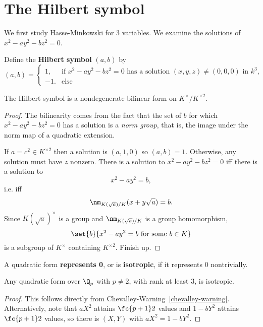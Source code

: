 \section{The Hilbert symbol}
We first study Hasse-Minkowski for 3 variables. We examine the solutions of $x^2-ay^2-bz^2=0$.
\begin{df}
Define the \textbf{Hilbert symbol} $(a,b)$ by
\[
(a,b)=\begin{cases}
1,&\text{if }x^2-ay^2-bz^2=0 \text{ has a solution $(x,y,z)\ne (0,0,0)$ in $k^3$,}\\
-1.&\text{else}
\end{cases}
\]
\end{df}
\begin{pr}
The Hilbert symbol is a nondegenerate bilinear form on $K^{\times}/K^{\times2}$.
\end{pr}
\begin{proof}
The bilinearity comes from the fact that the set of $b$ for which $x^2-ay^2-bz^2=0$ has a solution is a {\it norm group}, that is, the image under the norm map of a quadratic extension.

If $a=c^2\in K^{\times2}$ then a solution is $(a,1,0)$ so $(a,b)=1$. %
Otherwise, any solution must have $z$ nonzero. There is a solution to $x^2-ay^2-bz^2=0$ iff there is a solution to
\[
x^2-ay^2=b,
\]
i.e. iff
\[
\nm_{K(\sqrt{a})/K}(x+y\sqrt a)=b.
\]
Since $K(\sqrt{a})^{\times}$ is a group and $\nm_{K(\sqrt{a})/K}$ is a group homomorphism,
\[
\set{b}{x^2-ay^2=b\text{ for some }b\in K}
\]
is a subgroup of $K^{\times}$ containing $K^{\times 2}$.
Finish up.
\end{proof}
\begin{df}
A quadratic form \textbf{represents 0}, or is \textbf{isotropic}, if it represents 0 nontrivially.
\end{df}
\begin{lem}
Any quadratic form over $\Q_p$ with $p\ne 2$, with rank at least 3, is isotropic.
\end{lem}
\begin{proof}
This follows directly from Chevalley-Warning~\ref{chevalley-warning}. Alternatively, note that $aX^2$ attains $\fc{p+1}2$ values and $1-bY^2$ attains $\fc{p+1}2$ values, so there is $(X,Y)$ with $aX^2=1-bY^2$.
\end{proof}
